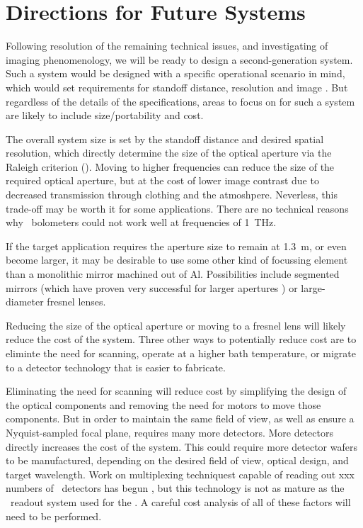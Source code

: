 \section{Directions for Future Systems}

Following resolution of the remaining technical issues, and investigating of imaging phenomenology, we will be ready to design a second-generation system.
Such a system would be designed with a specific operational scenario in mind, which would set requirements for standoff distance, resolution and image \NETD.
But regardless of the details of the specifications, areas to focus on for such a system are likely to include size/portability and cost.

The overall system size is set by the standoff distance and desired spatial resolution, which directly determine the size of the optical aperture via the Raleigh criterion ().
Moving to higher frequencies can reduce the size of the required optical aperture, but at the cost of lower image contrast due to decreased transmission through clothing and the atmoshpere.
Neverless, this trade-off may be worth it for some applications.
There are no technical reasons why \TES\ bolometers could not work well at frequencies of \SI{1}{\THz}.

If the target application requires the aperture size to remain at \SI{1.3}{\m}, or even become larger, it may be desirable to use some other kind of focussing element than a monolithic mirror machined out of Al.
Possibilities include segmented mirrors (which have proven very successful for larger apertures \cite{stp, act}) or large-diameter fresnel lenses.

Reducing the size of the optical aperture or moving to a fresnel lens will likely reduce the cost of the system.
Three other ways to potentially reduce cost are to eliminte the need for scanning, operate at a higher bath temperature, or migrate to a detector technology that is easier to fabricate.

Eliminating the need for scanning will reduce cost by simplifying the design of the optical components and removing the need for motors to move those components.
But in order to maintain the same field of view, as well as ensure a Nyquist-sampled focal plane, requires many more detectors.
More detectors directly increases the cost of the system.
This could require more detector wafers to be manufactured, depending on the desired field of view, optical design, and target wavelength.
Work on multiplexing techniquest capable of reading out xxx numbers of \TES\ detectors has begun \cite{xxx}, but this technology is not as mature as the \TDM\ readout system used for the \Imager.
A careful cost analysis of all of these factors will need to be performed.

